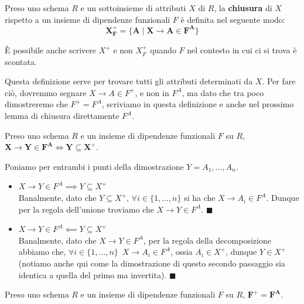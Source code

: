 \documentclass[11pt, a4paper, titlepage, oneside]{scrbook}
\begin{document}
\begin{Definizione}
\label{def-chiusura-insieme-attributi}
Preso uno schema $R$ e un sottoinsieme di attributi $X$ di $R$, la \textbf{chiusura} di $X$ rispetto a un insieme di dipendenze funzionali $F$ è definita nel seguente modo:
\[
\bm{X_F^+ = \{A \mid X} \longrightarrow \bm{A \in F^A\}}
\]

È possibile anche scrivere $X^+$ e non $X_F^+$ quando $F$ nel contesto in cui ci si trova è scontata.

\NB Questa definizione serve per trovare tutti gli attributi determinati da $X$. Per fare ciò, dovremmo segnare $X \longrightarrow A \in F^+$, e non in $F^A$, ma dato che tra poco dimostreremo che $F^+ = F^A$, scriviamo in questa definizione e anche nel prossimo lemma di chiusura direttamente $F^A$. 
\end{Definizione}

\begin{Proposizione}
\label{lemma-di-chiusura}
Preso uno schema $R$ e un insieme di dipendenze funzionali $F$ su $R$, \mbox{$\bm{X} \longrightarrow \bm{Y \in F^A} \iff \bm{Y \subseteq X^+}$}.
\end{Proposizione}

\Dimostrazione \nopagebreak

Poniamo per entrambi i punti della dimostrazione $Y = A_1, \ldots, A_n$.
\begin{itemize}
    \item $X \longrightarrow Y \in F^A \implies Y \subseteq X^+$ \\
    Banalmente, dato che $Y \subseteq X^+$, $\forall i \in \{1, \ldots, n\}$ si ha che $X \longrightarrow A_i \in F^A$. Dunque per la regola dell'unione troviamo che $X \longrightarrow Y \in F^A$. $\blacksquare$
    \item $X \longrightarrow Y \in F^A \impliedby Y \subseteq X^+$ \\
    Banalmente, dato che $X \longrightarrow Y \in F^A$, per la regola della decomposizione abbiamo che, $\forall i \in \{1, \ldots, n\} \enspace X \longrightarrow A_i \in F^A$, ossia $A_i \in X^+$, dunque $Y \in X^+$ (notiamo anche qui come la dimostrazione di questo secondo passaggio sia identica a quella del primo ma invertita). $\blacksquare$
\end{itemize}

\begin{Proposizione}[Teorema]
\label{propos-teorema-op}
Preso uno schema $R$ e un insieme di dipendenze funzionali $F$ su $R$, \mbox{$\bm{F^+ = F^A}$}.
\end{Proposizione}
\end{document}
